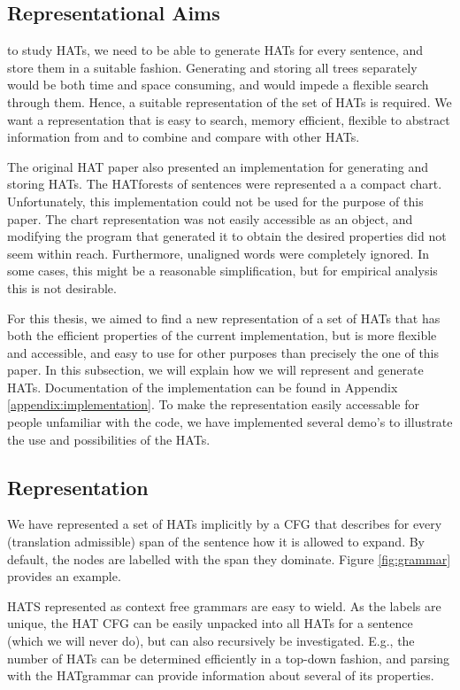 \documentclass[hidelinks]{report}
\begin{document}
\subsection{Representational Aims}

to study HATs, we need to be able to generate HATs for every sentence, and store them in a suitable fashion. Generating and storing all trees separately would be both time and space consuming, and would impede a flexible search through them. Hence, a suitable representation of the set of HATs is required. We want a representation that is easy to search, memory efficient, flexible to abstract information from and to combine and compare with other HATs.

The original HAT paper also presented an implementation for generating and storing HATs. The HATforests of sentences were represented a a compact chart. Unfortunately, this implementation could not be used for the purpose of this paper. The chart representation was not easily accessible as an object, and modifying the program that generated it to obtain the desired properties did not seem within reach. Furthermore, unaligned words were completely ignored. In some cases, this might be a reasonable simplification, but for empirical analysis this is not desirable.

For this thesis, we aimed to find a new representation of a set of HATs that has both the efficient properties of the current implementation, but is more flexible and accessible, and easy to use for other purposes than precisely the one of this paper. In this subsection, we will explain how we will represent and generate HATs. Documentation of the implementation can be found in Appendix \ref{appendix:implementation}. To make the representation easily accessable for people unfamiliar with the code, we have implemented several demo's to illustrate the use and possibilities of the HATs.


\subsection{Representation}

We have represented a set of HATs implicitly by a CFG that describes for every (translation admissible) span of the sentence how it is allowed to expand. By default, the nodes are labelled with the span they dominate. Figure \ref{fig:grammar} provides an example.

HATS represented as context free grammars are easy to wield. As the labels are unique, the HAT CFG can be easily unpacked into all HATs for a sentence (which we will never do), but can also recursively be investigated. E.g., the number of HATs can be determined efficiently in a top-down fashion, and parsing with the HATgrammar can provide information about several of its properties.
\end{document}
